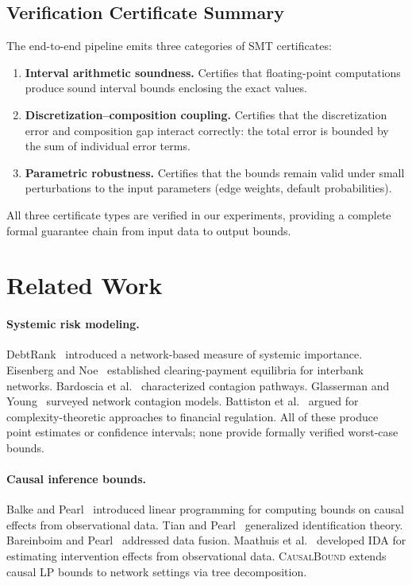 \documentclass[11pt,a4paper]{article}
\newcommand{\CausalBound}{\textsc{CausalBound}}
\begin{document}
\subsection{Verification Certificate Summary}
\label{sec:certs}

The end-to-end pipeline emits three categories of SMT certificates:

\begin{enumerate}[nosep]
\item \textbf{Interval arithmetic soundness.} Certifies that floating-point computations produce sound interval bounds enclosing the exact values.
\item \textbf{Discretization--composition coupling.} Certifies that the discretization error and composition gap interact correctly: the total error is bounded by the sum of individual error terms.
\item \textbf{Parametric robustness.} Certifies that the bounds remain valid under small perturbations to the input parameters (edge weights, default probabilities).
\end{enumerate}

All three certificate types are verified in our experiments, providing a complete formal guarantee chain from input data to output bounds.

\section{Related Work}
\label{sec:related}

\paragraph{Systemic risk modeling.} DebtRank~\citep{battiston2012debtrank} introduced a network-based measure of systemic importance. Eisenberg and Noe~\citep{eisenberg2001systemic} established clearing-payment equilibria for interbank networks. Bardoscia et al.~\citep{bardoscia2017pathways} characterized contagion pathways. Glasserman and Young~\citep{glasserman2016contagion} surveyed network contagion models. Battiston et al.~\citep{battiston2016complexity} argued for complexity-theoretic approaches to financial regulation. All of these produce point estimates or confidence intervals; none provide formally verified worst-case bounds.

\paragraph{Causal inference bounds.} Balke and Pearl~\citep{balke1997bounds} introduced linear programming for computing bounds on causal effects from observational data. Tian and Pearl~\citep{tian2002general} generalized identification theory. Bareinboim and Pearl~\citep{bareinboim2016causal} addressed data fusion. Maathuis et al.~\citep{maathuis2009estimating} developed IDA for estimating intervention effects from observational data. \CausalBound{} extends causal LP bounds to network settings via tree decomposition.
\end{document}
